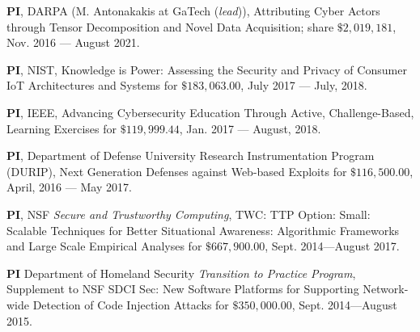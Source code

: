 \documentclass[11pt]{article}
\newcommand{\ignore}[1]{}
\newenvironment{cvhanglist}{%
  \begin{list}{}{%
    \setlength{\leftmargin}{1.8em}%
    \setlength{\itemindent}{-1.8em}%
    \setlength{\labelwidth}{0pt}%
    \setlength{\labelsep}{0pt}%
    \setlength{\itemsep}{0.35em}%
    \setlength{\parsep}{0pt}%
    \setlength{\topsep}{0.25em}%
  }%
}{\end{list}}
\begin{document}
\begin{cvhanglist}
\begin{cvhanglist}
\item {\bf PI}, DARPA (M. Antonakakis at GaTech ({\it lead})), {\sc Attributing Cyber Actors through Tensor Decomposition and Novel Data Acquisition}; share $\$2,019,181$, Nov. 2016 --- August 2021. \hfill

\item {\bf PI}, NIST, {\sc Knowledge is Power: Assessing the Security and Privacy of Consumer IoT Architectures and Systems} for $\$183,063.00$, July 2017 --- July, 2018. \hfill

\item {\bf PI}, IEEE, {\sc Advancing Cybersecurity Education Through Active, Challenge-Based, Learning Exercises} for $\$119,999.44$, Jan. 2017 --- August, 2018. \hfill

\item {\bf PI}, Department of Defense University Research Instrumentation Program (DURIP), {\sc Next Generation Defenses against Web-based Exploits} for $\$116,500.00$, April, 2016 --- May 2017. \hfill


\item {\bf PI}, NSF {\it Secure and Trustworthy Computing}, {\sc TWC: TTP Option: Small: Scalable Techniques for Better Situational Awareness: Algorithmic Frameworks and Large Scale Empirical Analyses}
 for $\$667,900.00$, Sept. 2014---August 2017. \hfill

\item {\bf PI} Department of Homeland Security {\it Transition to Practice Program}, {\sc Supplement to NSF SDCI Sec: New Software Platforms for Supporting Network-wide Detection of Code Injection Attacks}
 for $\$350,000.00$, Sept. 2014---August 2015. \hfill

\ignore{
\item {\bf PI}, Department of Defense University Research Instrumentation Program (DURIP), {\sc Next-generation defenses for securing VoIP communications} for $\$114,345.00$, June, 2013 --- May 2014. \hfill


\item {\bf PI}, NSF {\it Secure and Trustworthy Computing}, {\sc Toward Pronounceable Authentication Strings}
 for $\$499,997.00$, Aug. 2013---July 2016. \hfill


}
\end{cvhanglist}
\end{cvhanglist}
\end{document}
